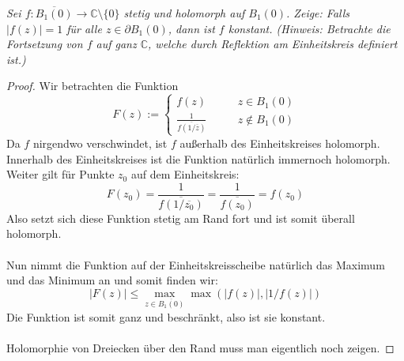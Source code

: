\documentclass[11pt]{article}
\newenvironment{problem}[2][Beispiel]{
    \begin{trivlist}
        \item[\hskip \labelsep {\bfseries #1}\hskip \labelsep {\bfseries #2.}] \itshape}{
    \end{trivlist}\normalshape
}
\begin{document}
    \begin{problem}{5}
        Sei $f: \overline{B_1(0)} \rightarrow \mathbb{C}\setminus\{0\}$ stetig und holomorph auf $B_1(0)$. Zeige:
        Falls $|f(z)|=1$ für alle $z \in \partial B_1(0)$, dann ist $f$ konstant.
        (Hinweis: Betrachte die Fortsetzung von $f$ auf ganz $\mathbb{C}$, welche durch Reflektion am
        Einheitskreis definiert ist.)
    \end{problem}

    \begin{proof}
        Wir betrachten die Funktion
        $$F(z):=
        \begin{cases}
            f(z)\qquad &z\in B_1(0)\\
             \frac{1}{\overline{f(1/\overline{z})}}\qquad &z\notin B_1(0)
        \end{cases}$$
        Da $f$ nirgendwo verschwindet, ist $f$ außerhalb des Einheitskreises holomorph.
        Innerhalb des Einheitskreises ist die Funktion natürlich immernoch holomorph. \\
        Weiter gilt für Punkte $z_0$ auf dem Einheitskreis:
        $$F(z_0) = \frac{1}{\overline{f(1/\overline{z_0})}} =\frac{1}{\overline{f(z_0)}}=f(z_0)$$
        Also setzt sich diese Funktion stetig am Rand fort und ist somit überall holomorph.\\\\
        Nun nimmt die Funktion auf der Einheitskreisscheibe natürlich das Maximum und das Minimum an
        und somit finden wir:
        $$|F(z)|\leq \max_{z\in \overline{B_1(0)}} \max(|f(z)|, |1/f(z)|) $$
        Die Funktion ist somit ganz und beschränkt, also ist sie konstant.\\\\
        Holomorphie von Dreiecken über den Rand muss man eigentlich noch zeigen.
    \end{proof}
\end{document}
